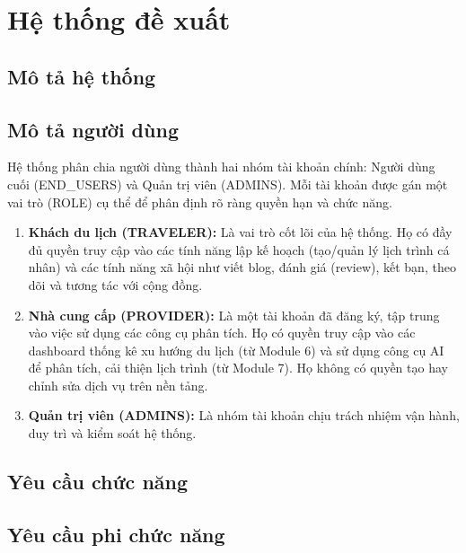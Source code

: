 \section{Hệ thống đề xuất}

\subsection{Mô tả hệ thống}


\subsection{Mô tả người dùng}
\label{sec:mo_ta_nguoi_dung}
Hệ thống phân chia người dùng thành hai nhóm tài khoản chính: Người dùng cuối (END\_USERS) và Quản trị viên (ADMINS). Mỗi tài khoản được gán một vai trò (ROLE) cụ thể để phân định rõ ràng quyền hạn và chức năng.

\begin{enumerate}

    \item \textbf{Khách du lịch (TRAVELER):} Là vai trò cốt lõi của hệ thống. Họ có đầy đủ quyền truy cập vào các tính năng lập kế hoạch (tạo/quản lý lịch trình cá nhân) và các tính năng xã hội như viết blog, đánh giá (review), kết bạn, theo dõi và tương tác với cộng đồng.
        
       \item \textbf{Nhà cung cấp (PROVIDER):} Là một tài khoản đã đăng ký, tập trung vào việc sử dụng các công cụ phân tích. Họ có quyền truy cập vào các dashboard thống kê xu hướng du lịch (từ Module 6) và sử dụng công cụ AI để phân tích, cải thiện lịch trình (từ Module 7). Họ không có quyền tạo hay chỉnh sửa dịch vụ trên nền tảng.

    \item \textbf{Quản trị viên (ADMINS):} Là nhóm tài khoản chịu trách nhiệm vận hành, duy trì và kiểm soát hệ thống. 
\end{enumerate}

\subsection{Yêu cầu chức năng}


\subsection{Yêu cầu phi chức năng}



